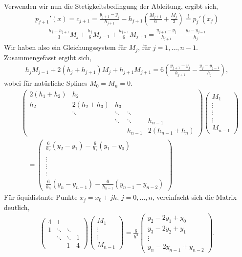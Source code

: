 Verwenden wir nun die Stetigkeitsbedingung der Ableitung, ergibt sich,
\begin{align*}
p_{j+1}'(x) = c_{j+1} = \frac{y_{j+1}-y_j}{h_{j+1}} -
h_{j+1}\left(\frac{M_{j+1}}{6}+\frac{M_j}{3}\right) \overset{!}{=} p_j'(x_j)
\end{align*}
\begin{align*}
\frac{h_j+h_{j+1}}{3}M_j + \frac{h_j}{6}M_{j-1} + \frac{h_{j+1}}{6}M_{j+1} =
\frac{y_{j+1}- y_j}{h_{j+1}} - \frac{y_j - y_{j-1}}{h_j}
\end{align*}
Wir haben also ein Gleichungssystem für $M_j$, für $j=1,\ldots,n-1$.
Zusammengefasst ergibt sich,
\begin{align*}
h_j M_{j-1} + 2(h_j + h_{j+1})M_j + h_{j+1}M_{j+1} = 6\left( 
\frac{y_{j+1}-y_j}{h_{j+1}} - \frac{y_j - y_{j-1}}{h_j}
\right),
\end{align*}
wobei für natürliche Splines $M_0=M_n = 0$.
\begin{align*}
&\begin{pmatrix}
2(h_1+h_2) & h_2\\
h_2 & 2(h_2+h_3) & h_3\\
& \ddots & \ddots & \ddots\\
&& \ddots & \ddots & h_{n-1}\\
&&& h_{n-1} & 2(h_{n-1}+h_{n})
\end{pmatrix}
\begin{pmatrix}
M_1\\ \vdots \\ \vdots \\ \vdots \\ M_{n-1}
\end{pmatrix}\\
&\quad=
\begin{pmatrix}
\frac{6}{h_2}(y_2-y_1) - \frac{6}{h_1}(y_1-y_0)\\
\\ \vdots \\ \vdots \\ \vdots \\
\frac{6}{h_n}(y_n-y_{n-1}) - \frac{6}{h_{n-1}}(y_{n-1}-y_{n-2})
\end{pmatrix}\tag{7}
\end{align*}
Für äquidistante Punkte $x_j = x_0 + jh$, $j=0,\ldots,n$, vereinfacht sich die
Matrix deutlich,
\begin{align*}
\begin{pmatrix}
4 & 1 \\
1 & \ddots & \ddots\\
&\ddots & \ddots & 1\\
&& 1 & 4
\end{pmatrix}
\begin{pmatrix}
M_1\\ \vdots \\ \vdots \\ M_{n-1}
\end{pmatrix}
= 
\frac{6}{h^2}
\begin{pmatrix}
y_2-2y_1+y_0\\
y_3-2y_2+y_1\\
\vdots\\
y_n-2y_{n-1}+y_{n-2}
\end{pmatrix}.
\end{align*}

